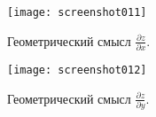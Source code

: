 \begin{figure}[H]
	\centering
	\begin{minipage}{0.45\linewidth}
		\centering
		\texttt{[image: screenshot011]}
		\caption{Геометрический смысл \( \frac{\partial z}{\partial x} \).}
		\label{fig:2.1.1.1}
	\end{minipage}
	\begin{minipage}{0.45\linewidth}
		\centering
		\texttt{[image: screenshot012]}
		\caption{Геометрический смысл \( \frac{\partial z}{\partial y} \).}
		\label{fig:2.1.1.2}
	\end{minipage}
\end{figure}